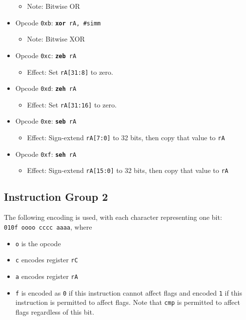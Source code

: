 \documentclass{article}
\begin{document}
\begin{itemize}
		\begin{itemize}
			\item Note: Bitwise OR
		\end{itemize}
		\item Opcode \texttt{0xb}:
			\texttt{\textbf{xor} rA, \#simm}
		\begin{itemize}
			\item Note: Bitwise XOR
		\end{itemize}
		\item Opcode \texttt{0xc}:
			\texttt{\textbf{zeb} rA}
		\begin{itemize}
			\item Effect: Set \texttt{rA[31:8]} to zero.
		\end{itemize}
		\item Opcode \texttt{0xd}:
			\texttt{\textbf{zeh} rA}
		\begin{itemize}
			\item Effect: Set \texttt{rA[31:16]} to zero.
		\end{itemize}
		\item Opcode \texttt{0xe}:
			\texttt{\textbf{seb} rA}
		\begin{itemize}
			\item Effect:
				Sign-extend \texttt{rA[7:0]} to 32 bits, then copy that
				value to \texttt{rA}
		\end{itemize}
		\item Opcode \texttt{0xf}:
			\texttt{\textbf{seh} rA}
		\begin{itemize}
			\item Effect:
				Sign-extend \texttt{rA[15:0]} to 32 bits, then copy that
				value to \texttt{rA}
		\end{itemize}
	\end{itemize}

	\doublespacing

	\subsection{Instruction Group 2}
	The following encoding is used, with each character representing one
	bit: \\
	\texttt{010f oooo cccc aaaa}, where

	\singlespacing
	\begin{itemize}
		\item \texttt{o} is the opcode
		\item \texttt{c} encodes register \texttt{rC}
		\item \texttt{a} encodes register \texttt{rA}
		\item \texttt{f} is encoded as \texttt{0} if this instruction
		cannot affect flags and encoded \texttt{1} if this instruction is
		permitted to affect flags. Note that \texttt{cmp} is permitted to
		affect flags regardless of this bit.
	\end{itemize}
	\doublespacing
\end{document}
